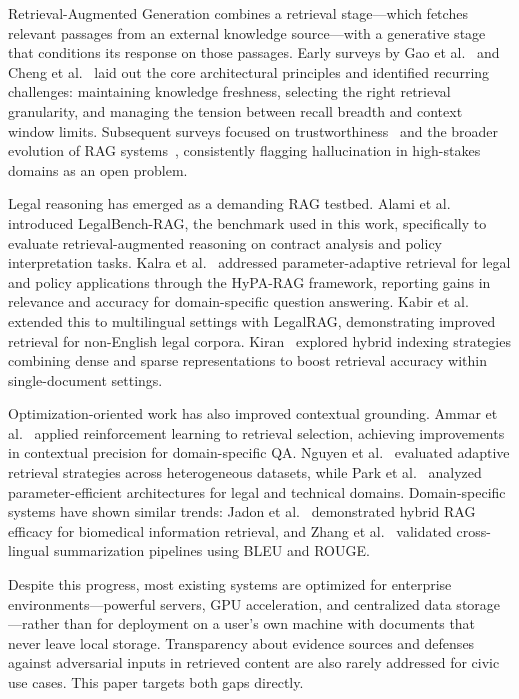 \documentclass[conference]{IEEEtran}
\begin{document}
Retrieval-Augmented Generation combines a retrieval stage---which fetches relevant passages from an external knowledge source---with a generative stage that conditions its response on those passages. Early surveys by Gao et al.~\cite{b1} and Cheng et al.~\cite{b2} laid out the core architectural principles and identified recurring challenges: maintaining knowledge freshness, selecting the right retrieval granularity, and managing the tension between recall breadth and context window limits. Subsequent surveys focused on trustworthiness~\cite{b5} and the broader evolution of RAG systems~\cite{b6,b7}, consistently flagging hallucination in high-stakes domains as an open problem.

Legal reasoning has emerged as a demanding RAG testbed. Alami et al.~\cite{b4} introduced LegalBench-RAG, the benchmark used in this work, specifically to evaluate retrieval-augmented reasoning on contract analysis and policy interpretation tasks. Kalra et al.~\cite{b3} addressed parameter-adaptive retrieval for legal and policy applications through the HyPA-RAG framework, reporting gains in relevance and accuracy for domain-specific question answering. Kabir et al.~\cite{b10} extended this to multilingual settings with LegalRAG, demonstrating improved retrieval for non-English legal corpora. Kiran~\cite{b9} explored hybrid indexing strategies combining dense and sparse representations to boost retrieval accuracy within single-document settings.

Optimization-oriented work has also improved contextual grounding. Ammar et al.~\cite{b17} applied reinforcement learning to retrieval selection, achieving improvements in contextual precision for domain-specific QA. Nguyen et al.~\cite{b22} evaluated adaptive retrieval strategies across heterogeneous datasets, while Park et al.~\cite{b23} analyzed parameter-efficient architectures for legal and technical domains. Domain-specific systems have shown similar trends: Jadon et al.~\cite{b18} demonstrated hybrid RAG efficacy for biomedical information retrieval, and Zhang et al.~\cite{b19} validated cross-lingual summarization pipelines using BLEU and ROUGE.

Despite this progress, most existing systems are optimized for enterprise environments---powerful servers, GPU acceleration, and centralized data storage---rather than for deployment on a user's own machine with documents that never leave local storage. Transparency about evidence sources and defenses against adversarial inputs in retrieved content are also rarely addressed for civic use cases. This paper targets both gaps directly.
\end{document}
